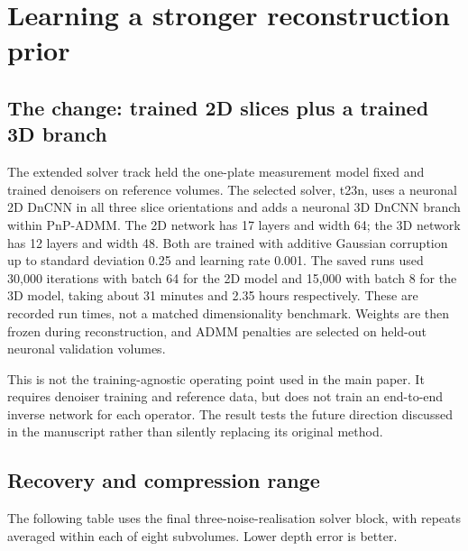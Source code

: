 \section{Learning a stronger reconstruction prior}

\subsection{The change: trained 2D slices plus a trained 3D branch}

The extended solver track held the one-plate measurement model fixed and trained denoisers on reference volumes. The selected solver, t23n, uses a neuronal 2D DnCNN in all three slice orientations and adds a neuronal 3D DnCNN branch within PnP-ADMM. The 2D network has 17 layers and width 64; the 3D network has 12 layers and width 48. Both are trained with additive Gaussian corruption up to standard deviation 0.25 and learning rate 0.001. The saved runs used 30,000 iterations with batch 64 for the 2D model and 15,000 with batch 8 for the 3D model, taking about 31 minutes and 2.35 hours respectively. These are recorded run times, not a matched dimensionality benchmark. Weights are then frozen during reconstruction, and ADMM penalties are selected on held-out neuronal validation volumes.

This is not the training-agnostic operating point used in the main paper. It requires denoiser training and reference data, but does not train an end-to-end inverse network for each operator. The result tests the future direction discussed in the manuscript rather than silently replacing its original method.

\subsection{Recovery and compression range}

The following table uses the final three-noise-realisation solver block, with repeats averaged within each of eight subvolumes. Lower depth error is better.

